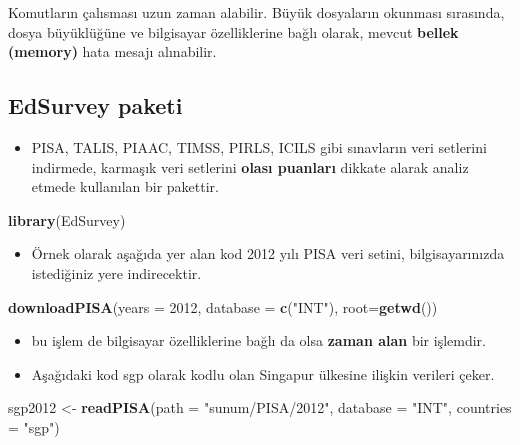 \documentclass[
  oneside]{book}
\newenvironment{Shaded}{\begin{snugshade}}{\end{snugshade}}
\newcommand{\AttributeTok}[1]{\textcolor[rgb]{0.13,0.29,0.53}{#1}}
\newcommand{\DecValTok}[1]{\textcolor[rgb]{0.00,0.00,0.81}{#1}}
\newcommand{\FunctionTok}[1]{\textcolor[rgb]{0.13,0.29,0.53}{\textbf{#1}}}
\newcommand{\NormalTok}[1]{#1}
\newcommand{\OtherTok}[1]{\textcolor[rgb]{0.56,0.35,0.01}{#1}}
\newcommand{\StringTok}[1]{\textcolor[rgb]{0.31,0.60,0.02}{#1}}
\providecommand{\tightlist}{%
  \setlength{\itemsep}{0pt}\setlength{\parskip}{0pt}}
\begin{document}
Komutların çalısması uzun zaman alabilir. Büyük dosyaların okunması sırasında, dosya büyüklüğüne ve bilgisayar özelliklerine bağlı olarak, mevcut \textbf{bellek (memory)} hata mesajı alınabilir.

\hypertarget{edsurvey-paketi}{%
\subsection{\texorpdfstring{\textbf{EdSurvey} paketi}{EdSurvey paketi}}\label{edsurvey-paketi}}

\begin{itemize}
\tightlist
\item
  PISA, TALIS, PIAAC, TIMSS, PIRLS, ICILS gibi sınavların veri setlerini indirmede, karmaşık veri setlerini \textbf{olası puanları} dikkate alarak analiz etmede kullanılan bir pakettir.
\end{itemize}

\begin{Shaded}
\begin{Highlighting}[]
\FunctionTok{library}\NormalTok{(EdSurvey)}
\end{Highlighting}
\end{Shaded}

\begin{itemize}
\tightlist
\item
  Örnek olarak aşağıda yer alan kod 2012 yılı PISA veri setini, bilgisayarınızda istediğiniz yere indirecektir.
\end{itemize}

\begin{Shaded}
\begin{Highlighting}[]
\FunctionTok{downloadPISA}\NormalTok{(}\AttributeTok{years =} \DecValTok{2012}\NormalTok{, }\AttributeTok{database =} \FunctionTok{c}\NormalTok{(}\StringTok{"INT"}\NormalTok{), }\AttributeTok{root=}\FunctionTok{getwd}\NormalTok{())}
\end{Highlighting}
\end{Shaded}

\begin{itemize}
\item
  bu işlem de bilgisayar özelliklerine bağlı da olsa \textbf{zaman alan} bir işlemdir.
\item
  Aşağıdaki kod sgp olarak kodlu olan Singapur ülkesine ilişkin verileri çeker.
\end{itemize}

\begin{Shaded}
\begin{Highlighting}[]
\NormalTok{sgp2012 }\OtherTok{\textless{}{-}} \FunctionTok{readPISA}\NormalTok{(}\AttributeTok{path =} \StringTok{"sunum/PISA/2012"}\NormalTok{, }\AttributeTok{database =} \StringTok{"INT"}\NormalTok{, }\AttributeTok{countries =} \StringTok{"sgp"}\NormalTok{)}
\end{Highlighting}
\end{Shaded}
\end{document}
